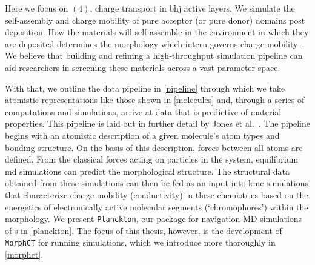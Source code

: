 
Here we focus on $(4)$, charge transport in \gls{bhj} active layers.
We simulate the self-assembly and charge mobility of pure acceptor (or
pure donor) domains post deposition. 
How the materials will self-assemble in the environment in which they are deposited determines
the morphology which intern governs charge mobility~\cite{Vanlaeke2006}\cite{McMahon2011}. We believe that building and refining a high-throughput simulation pipeline can aid researchers in screening these materials across a vast parameter space. 

With that, we outline the data pipeline in \autoref{pipeline} through which we take atomistic representations like
those shown in \autoref{molecules} and, through a series of computations and simulations,
arrive at data that is predictive of material properties. 
This pipeline is laid out in further detail by Jones et al.~\cite{Jones2017}.
The pipeline begins with an atomistic description of a given molecule's atom types and bonding structure.
On the basis of this description, forces between all atoms are defined. From the classical forces acting on
particles in the system,  equilibrium \gls{md} simulations can predict the morphological structure. 
The structural data obtained from these simulations can then be fed as an input into \gls{kmc}
simulations that characterize charge mobility (conductivity) in these chemistries based on the
energetics of electronically active molecular segments (`chromophores') within the morphology.
We present \texttt{Planckton}, our package for navigation MD simulations of s in \autoref{planckton}. 
The focus of this thesis, however, is the development of \texttt{MorphCT} for running  simulations, which we
introduce more thoroughly in \autoref{morphct}.

